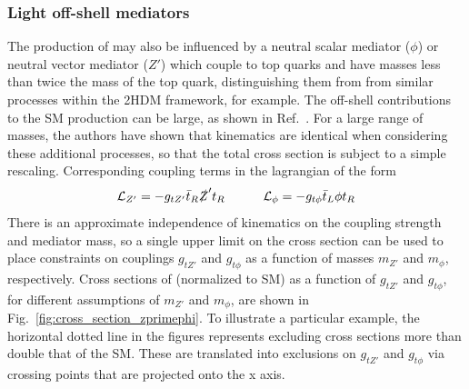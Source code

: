 \subsubsection{Light off-shell mediators}

The production of \tttt may also be influenced by a neutral scalar mediator
($\phi$) or neutral vector mediator ($Z'$) which couple to top quarks and have
masses less than twice the mass of the top quark, distinguishing them from
from similar processes within the 2HDM framework, for example. The off-shell contributions
to the SM \tttt production can be large, as shown in
Ref.~\cite{THEORY:Alvarez2016nrz}. For a large range of masses, the authors have
shown that kinematics are identical when considering these additional
processes, so that the total \tttt cross section is subject to a simple
rescaling.  Corresponding coupling terms in the lagrangian of the form
\begin{equation}
    \mathcal{L}_{Z'}=-g_{t Z'}\bar{t}_R \slashed{Z}' t_R
    \quad\quad\quad
    \mathcal{L}_{\phi}=-g_{t \phi}\bar{t}_L \phi t_R
\end{equation}
There is an approximate independence of kinematics on the coupling strength and mediator mass,
so a single upper limit on the \tttt cross section can be used to place constraints 
on couplings $g_{tZ'}$ and $g_{t\phi}$ as a function of masses $m_{Z'}$ and $m_{\phi}$,
respectively.
Cross sections of \tttt (normalized to SM) as a function of $g_{tZ'}$ 
and $g_{t\phi}$, for different assumptions of $m_{Z'}$ and $m_{\phi}$,
are shown in Fig.~\ref{fig:cross_section_zprimephi}. To illustrate a particular example,
the horizontal dotted line in the figures represents excluding cross sections more than
double that of the SM. These are translated into exclusions on $g_{tZ'}$ and $g_{t\phi}$
via crossing points that are projected onto the x axis.

